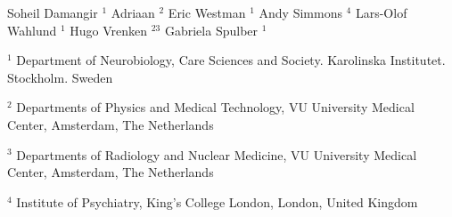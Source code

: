 Soheil Damangir $^1$
Adriaan $^2$
Eric Westman $^1$ 
Andy Simmons $^4$
Lars-Olof Wahlund $^1$
Hugo Vrenken $^{23}$
Gabriela Spulber $^1$

$^1$ Department of Neurobiology, Care Sciences and Society. Karolinska Institutet. Stockholm. Sweden

$^2$ Departments of Physics and Medical Technology, VU University Medical Center, Amsterdam, The Netherlands

$^3$ Departments of Radiology and Nuclear Medicine, VU University Medical Center, Amsterdam, The Netherlands

$^4$ Institute of Psychiatry, King's College London, London, United Kingdom
  
  
  